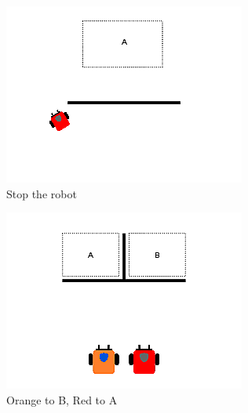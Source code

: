 \documentclass[]{article}
\begin{document}
\begin{figure}
\begin{subfigure}{0.42\textwidth}
		\label{fig:sub2}
	\end{subfigure}
	\begin{subfigure}{0.42\textwidth}
		\centering
		\includegraphics[width=\linewidth]{slide_images/Swarm_Robot_Control_-_Single_Robot_0007.png}
		\caption{Stop the robot}
		\label{fig:sub1}
	\end{subfigure}%
	\begin{subfigure}{0.42\textwidth}
		\centering
		\includegraphics[width=\linewidth]{slide_images/Swarm_Robot_Control_-_Single_Robot_0009.png}
		\caption{Orange to B, Red to A}
		\label{fig:sub2}
	\end{subfigure}
	\begin{subfigure}{0.42\textwidth}
		\centering

\end{subfigure}
\end{figure}
\end{document}

